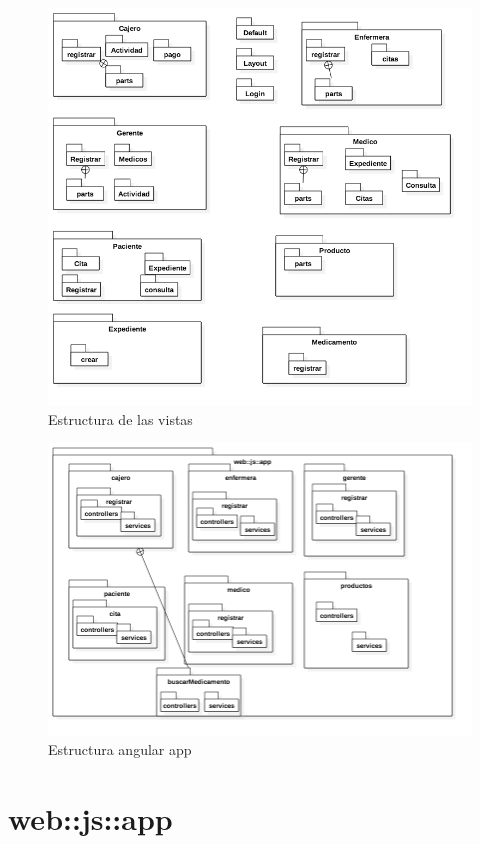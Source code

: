 	\begin{figure}[htbp!]
		\centering
			\includegraphics[width=1\textwidth]{images/logico33}
		\caption{Estructura de las vistas}
	\end{figure}
	
	\begin{figure}[htbp!]
		\centering
			\includegraphics[width=1\textwidth]{images/logico34}
		\caption{Estructura angular app}
	\end{figure}
	
	
	\newpage
	\section{web::js::app}

